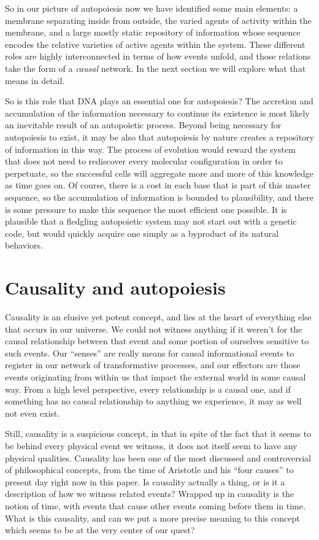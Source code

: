 \documentclass[12pt]{scrartcl}
\begin{document}
So in our picture of autopoiesis now we have identified some main elements:  a membrane separating inside from outside, the varied agents of activity within the membrane, and a large mostly static repository of information whose sequence encodes the relative varieties of active agents within the system.  These different roles are highly interconnected in terms of how events unfold, and those relations take the form of a \emph{causal} network.  In the next section we will explore what that means in detail.  

So is this role that DNA plays an essential one for autopoiesis?  The accretion and accumulation of the information necessary to continue its existence is most likely an inevitable result of an autopoietic process.  Beyond being necessary for autopoiesis to exist, it may be also that autopoiesis by nature creates a repository of information in this way.  The process of evolution would reward the system that does not need to rediscover every molecular configuration in order to perpetuate, so the successful cells will aggregate more and more of this knowledge as time goes on.  Of course, there is a cost in each base that is part of this master sequence, so the accumulation of information is bounded to plausibility, and there is some pressure to make this sequence the most efficient one possible.  It is plausible that a fledgling autopoietic system may not start out with a genetic code, but would quickly acquire one simply as a byproduct of its natural behaviors.  

\section{Causality and autopoiesis}

Causality is an elusive yet potent concept, and lies at the heart of everything else that occurs in our universe.  We could not witness anything if it weren't for the causal relationship between that event and some portion of ourselves sensitive to such events.  Our ``senses'' are really means for causal informational events to register in our network of transformative processes, and our effectors are those events originating from within us that impact the external world in some causal way.  From a high level perspective, every relationship is a causal one, and if something has no causal relationship to anything we experience, it may as well not even exist.  

Still, causality is a suspicious concept, in that in spite of the fact that it seems to be behind every physical event we witness, it does not itself seem to have any physical qualities.  Causality has been one of the most discussed and controversial of philosophical concepts, from the time of Aristotle and his ``four causes'' to present day right now in this paper.  Is causality actually a thing, or is it a description of how we witness related events?  Wrapped up in causality is the notion of time, with events that cause other events coming before them in time.  What is this causality, and can we put a more precise meaning to this concept which seems to be at the very center of our quest?
\end{document}
